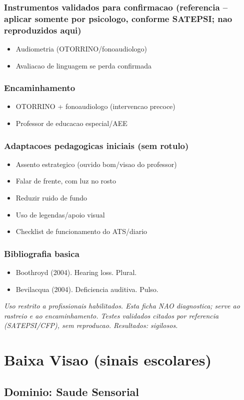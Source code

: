 \documentclass[a4paper,11pt]{book}
\newcommand{\avisolegal}{\par\medskip\noindent\footnotesize\itshape
\color{cinza}Uso restrito a profissionais habilitados. Esta ficha NAO diagnostica;
serve ao rastreio e ao encaminhamento. Testes validados citados por referencia
(SATEPSI/CFP), sem reproducao. Resultados: sigilosos.\color{black}\par}
\begin{document}
\subsection*{Instrumentos validados para confirmacao (referencia -- aplicar somente por psicologo, conforme SATEPSI; nao reproduzidos aqui)}
\begin{itemize}
\item Audiometria (OTORRINO/fonoaudiologo)
\item Avaliacao de linguagem se perda confirmada
\end{itemize}
\subsection*{Encaminhamento}
\begin{itemize}
\item OTORRINO + fonoaudiologo (intervencao precoce)
\item Professor de educacao especial/AEE
\end{itemize}
\subsection*{Adaptacoes pedagogicas iniciais (sem rotulo)}
\begin{itemize}
\item Assento estrategico (ouvido bom/visao do professor)
\item Falar de frente, com luz no rosto
\item Reduzir ruido de fundo
\item Uso de legendas/apoio visual
\item Checklist de funcionamento do ATS/diario
\end{itemize}
\subsection*{Bibliografia basica}
\begin{itemize}
\item Boothroyd (2004). Hearing loss. Plural.
\item Bevilacqua (2004). Deficiencia auditiva. Pulso.
\end{itemize}
\avisolegal


\chapter{Baixa Visao (sinais escolares)}
\section*{Dominio: Saude Sensorial}
\end{document}
